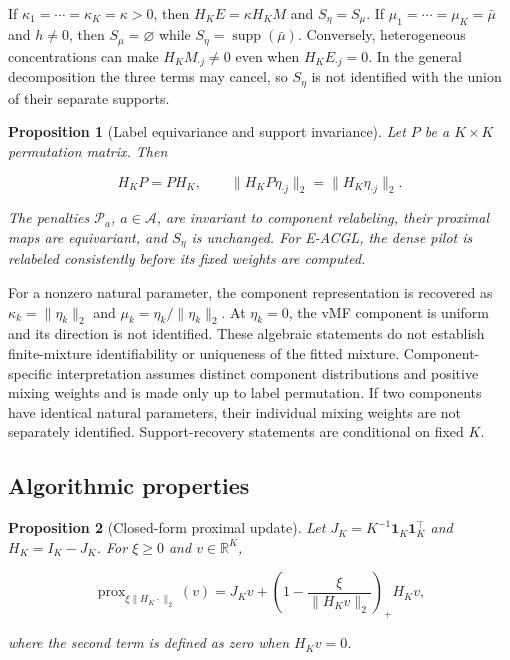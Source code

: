 \documentclass[preprint,12pt,authoryear]{elsarticle}
\newtheorem{proposition}{Proposition}
\begin{document}
If $\kappa_1=\cdots=\kappa_K=\kappa>0$, then
$H_KE=\kappa H_KM$ and $S_\eta=S_\mu$. If
$\mu_1=\cdots=\mu_K=\bar\mu$ and $h\neq0$, then
$S_\mu=\varnothing$ while $S_\eta=\operatorname{supp}(\bar\mu)$. Conversely,
heterogeneous concentrations can make $H_KM_{\cdot j}\neq0$ even when
$H_KE_{\cdot j}=0$. In the general decomposition the three terms may cancel,
so $S_\eta$ is not identified with the union of their separate supports.

\begin{proposition}[Label equivariance and support invariance]
\label{prop:label-invariance}
Let $P$ be a $K\times K$ permutation matrix. Then

\[
H_KP=PH_K,
\qquad
\lVert H_KP\eta_{\cdot j}\rVert_2
=\lVert H_K\eta_{\cdot j}\rVert_2.
\]

The penalties $\mathcal P_a$, $a\in\mathcal A$, are invariant to component
relabeling, their proximal maps are equivariant, and $S_{\eta}$ is unchanged.
For E-ACGL, the dense pilot is relabeled consistently before its fixed weights
are computed.
\end{proposition}

For a nonzero natural parameter, the component representation is recovered as
$\kappa_k=\lVert\eta_k\rVert_2$ and
$\mu_k=\eta_k/\lVert\eta_k\rVert_2$. At $\eta_k=0$, the vMF component is
uniform and its direction is not identified. These algebraic statements do
not establish finite-mixture identifiability or uniqueness of the fitted
mixture. Component-specific interpretation assumes distinct component
distributions and positive mixing weights and is made only up to label
permutation. If two components have identical natural parameters, their
individual mixing weights are not separately identified. Support-recovery
statements are conditional on fixed $K$.

\subsection{Algorithmic properties}

\begin{proposition}[Closed-form proximal update]
\label{prop:centered-prox}
Let $J_K=K^{-1}\mathbf1_K\mathbf1_K^\top$ and $H_K=I_K-J_K$. For
$\xi\geq0$ and $v\in\mathbb R^K$,

\[
\operatorname{prox}_{\xi\lVert H_K\cdot\rVert_2}(v)
=J_Kv+
\left(1-\frac{\xi}{\lVert H_Kv\rVert_2}\right)_+H_Kv,
\]

where the second term is defined as zero when $H_Kv=0$.
\end{proposition}
\end{document}
